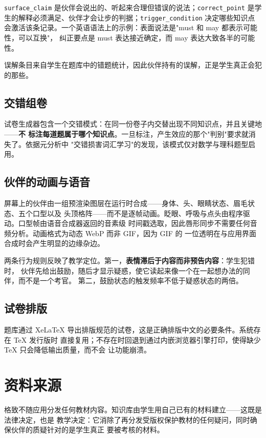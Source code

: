 \documentclass[11pt,a4paper,UTF8,fontset=windows]{ctexart}
\begin{document}
\texttt{surface\_claim} 是伙伴会说出的、听起来合理但错误的说法；\texttt{correct\_point}
是学生的解释必须满足、伙伴才会让步的判据；\texttt{trigger\_condition} 决定哪些知识点
会激活该条记录。一个英语语法上的示例：表面说法是"must 和 may 都表示可能性，可以互换"，
纠正要点是 must 表达接近确定，而 may 表达大致各半的可能性。

误解条目来自学生在题库中的错题统计，因此伙伴持有的误解，正是学生真正会犯的那些。

\subsection{交错组卷}

试卷生成器包含一个交错模式：在同一份卷子内交替出现不同知识点，并且关键地——\textbf{不
标注每道题属于哪个知识点}。一旦标注，产生效应的那个"判别"要求就消失了。依据元分析中
"交错损害词汇学习"的发现，该模式仅对数学与理科题型启用。

\subsection{伙伴的动画与语音}

屏幕上的伙伴由一组预渲染图层在运行时合成——身体、头、眼睛状态、眉毛状态、五个口型以及
头顶格阵——而不是逐帧动画。眨眼、呼吸与点头由程序驱动。口型帧由语音合成器返回的音素级
时间戳选取，因此唇形同步不需要任何音频分析。动画格式为动态 WebP 而非 GIF，因为 GIF 的
一位透明在与应用界面合成时会产生明显的边缘杂边。

两条行为规则反映了教学定位。第一，\textbf{表情滞后于内容而非预告内容}：学生犯错时，
伙伴先给出鼓励，随后才显示疑惑，使它读起来像一个在一起想办法的同伴，而不是一个考官。
第二，鼓励状态的触发频率不低于疑惑状态的两倍。

\subsection{试卷排版}

题库通过 XeLaTeX 导出排版规范的试卷，这是正确排版中文的必要条件。系统存在 TeX 发行版时
直接复用；不存在时回退到通过内嵌浏览器引擎打印，使得缺少 TeX 只会降低输出质量，而不会
让功能崩溃。

\section{资料来源}

格致不随应用分发任何教材内容。知识库由学生用自己已有的材料建立——这既是法律决定，也是
教学决定：它消除了再分发受版权保护教材的任何疑问，同时确保伙伴的质疑针对的是学生真正
要被考核的材料。
\end{document}
